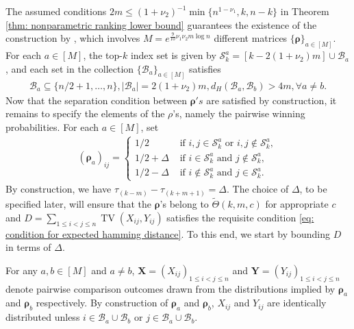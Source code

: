 \documentclass[letterpaper,12pt]{article}
\numberwithin{equation}{section}
\theoremstyle{plain}
\numberwithin{Theorem}{section}
\numberwithin{corollary}{section}
\numberwithin{proposition}{section}
\numberwithin{Lemma}{section}
{
	\theoremstyle{definition}
	\newtheorem{Definition}{Definition}
	\newtheorem{example}{Example}
	\numberwithin{example}{section}
	\newtheorem{fact}{Fact}
	\numberwithin{fact}{section}
	\newtheorem{remark}{Remark}
}
\newcommand{\1}{\mathbbm{1}}
\begin{document}
The assumed conditions $2m \leq (1 + \nu_2)^{-1}\min\{n^{1-\nu_1}, k, n-k\}$ in Theorem \ref{thm: nonparametric ranking lower bound} guarantees the existence of the construction by \cite{shah2017simple}, which involves $M = e^{\frac{9}{10}\nu_1\nu_2 m \log n}$ different matrices $\{\bm \rho\}_{a \in [M]}$. For each $a \in [M]$, the top-$k$ index set is given by $\mathcal S^a_k = [k - 2(1+\nu_2)m] \cup \mathcal B_a$, and each set in the collection $\{\mathcal B_a\}_{a \in [M]}$ satisfies 
\begin{align*}
	\mathcal B_a \subseteq \{n/2 + 1, \ldots, n\}, |\mathcal B_a| = 2(1+\nu_2)m, d_H(\mathcal B_a, \mathcal B_b) > 4m, \forall a \neq b. 
\end{align*} 
Now that the separation condition between $\bm \rho's$ are satisfied by construction, it remains to specify the elements of the $\rho$'s, namely the pairwise winning probabilities. For each $a \in [M]$, set
\begin{align*}
	(\bm \rho_a)_{ij} = \begin{cases}
		1/2 &\text{ if } i, j \in \mathcal S^a_k \text{ or } i, j \not \in \mathcal S^a_k,\\
		1/2 + \Delta &\text{ if } i \in \mathcal S^a_k \text{ and } j \not \in \mathcal S^a_k,\\
		1/2 - \Delta &\text{ if } i \not \in \mathcal S^a_k \text{ and } j \in \mathcal S^a_k.
	\end{cases}
\end{align*}
By construction, we have $\tau_{(k-m)} - \tau_{(k+m+1)} = \Delta$. The choice of $\Delta$, to be specified later, will ensure that the $\bm \rho$'s belong to $\widetilde \Theta(k, m, c)$ for appropriate $c$ and $D = \sum_{1 \leq i < j \leq n} \operatorname{TV}(X_{ij}, Y_{ij})$ satisfies the requisite condition \eqref{eq: condition for expected hamming distance}. To this end, we start by bounding $D$ in terms of $\Delta$. 

For any $a, b \in [M]$ and $a \neq b$, $\bm X = \left(X_{ij}\right)_{1 \leq i < j \leq n}$ and $\bm Y = \left(Y_{ij}\right)_{1 \leq i < j \leq n}$ denote pairwise comparison outcomes drawn from the distributions implied by $\bm \rho_a$ and $\bm \rho_b$ respectively. By construction of $\bm \rho_a$ and $\bm \rho_b$, $X_{ij}$ and $Y_{ij}$ are identically distributed unless $i \in \mathcal B_a \cup \mathcal B_b$ or $j \in \mathcal B_a \cup \mathcal B_b$.
\end{document}
